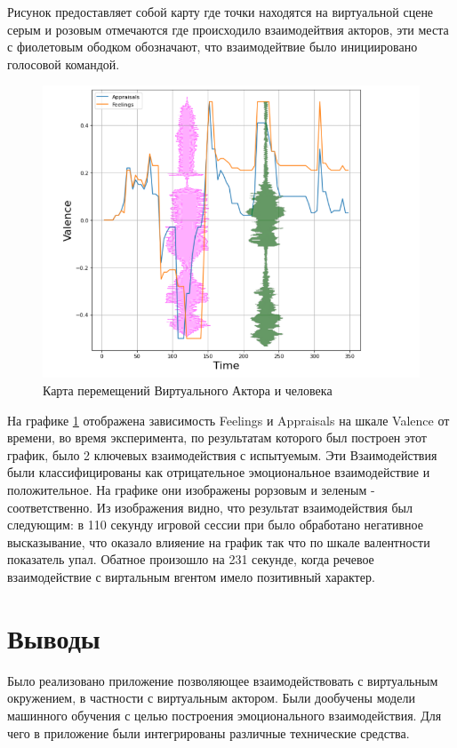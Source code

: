 Рисунок предоставляет собой карту где точки находятся на виртуальной сцене 
серым и розовым отмечаются где происходило взаимодейтвия акторов, эти 
места с фиолетовым ободком обозначают, что взаимодейтвие было инициировано
голосовой командой.

\begin{figure}[h]
\includegraphics[width=0.75\columnwidth]{./img/GRAFIK.png}
\centering
\caption{Карта перемещений Виртуального Актора и человека}
\label{pic:grafik_res}
\end{figure}

На графике \ref{pic:grafik_res} отображена зависимость Feelings и Appraisals
на шкале Valence от времени, во время эксперимента, по результатам которого 
был построен этот график, было 2 ключевых взаимодействия с испытуемым. Эти
Взаимодействия были классифицированы как отрицательное эмоциональное взаимодействие и положительное.
На графике они изображены рорзовым и зеленым - соответственно.
Из изображения видно, что результат взаимодействия был следующим:
в 110 секунду игровой сессии при было обработано негативное высказывание, что 
оказало влияение на график так что по шкале валентности показатель упал.
Обатное произошло на 231 секунде, когда речевое взаимодействие с виртальным 
вгентом имело позитивный характер.



\section{Выводы}

Было реализовано приложение позволяющее взаимодействовать с виртуальным окружением, в частности с виртуальным актором. 
Были дообучены модели машинного обучения с целью построения эмоционального взаимодействия. 
Для чего в приложение были интегрированы различные технические средства.
